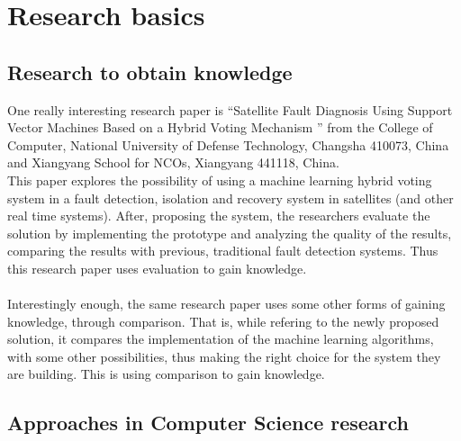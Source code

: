 \documentclass[english]{report}
\begin{document}
\clearpage
\chapter{Research basics}

\section{Research to obtain knowledge}

One really interesting research paper is ``Satellite Fault Diagnosis Using Support Vector Machines Based on a Hybrid Voting Mechanism '' from the College of Computer, National University of Defense Technology, Changsha 410073, China and Xiangyang School for NCOs, Xiangyang 441118, China. \cite{hybrid} \\
This paper explores the possibility of using a machine learning hybrid voting system in a fault detection, isolation and recovery system in satellites (and other real time systems). After, proposing the system, the researchers evaluate the solution by implementing the prototype and analyzing the quality of the results, comparing the results with previous, traditional fault detection systems. Thus this research paper uses evaluation to gain knowledge.
\\\\
Interestingly enough, the same research paper uses some other forms of gaining knowledge, through comparison. That is, while refering to the newly proposed solution, it compares the implementation of the machine learning algorithms, with some other possibilities, thus making the right choice for the system they are building. This is using comparison to gain knowledge. \cite[p.~10]{hybrid}

\section{Approaches in Computer Science research}
\end{document}
